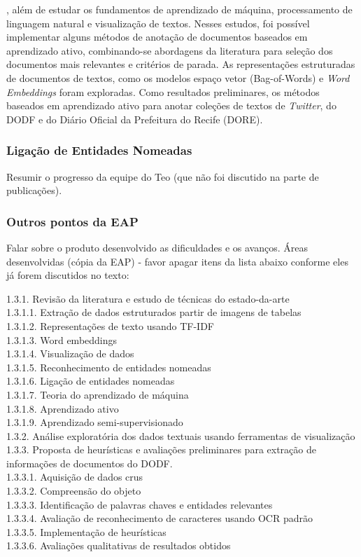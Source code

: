 \documentclass[12pt]{article}
\begin{document}
, além de estudar os fundamentos de aprendizado de máquina, processamento de linguagem natural e visualização de textos. Nesses estudos, foi possível implementar alguns métodos de anotação de documentos baseados em aprendizado ativo, combinando-se abordagens da literatura para seleção dos documentos mais relevantes e critérios de parada. As representações estruturadas de documentos de textos, como os modelos espaço vetor (Bag-of-Words) e \textit{Word Embeddings} foram exploradas. Como resultados preliminares, os métodos baseados em aprendizado ativo para anotar coleções de textos de \textit{Twitter}, do DODF e do Diário Oficial da Prefeitura do Recife (DORE).

\indent 

\subsubsection*{Ligação de Entidades Nomeadas}

	Resumir o progresso da equipe do Teo (que não foi discutido na parte de publicações).

\subsubsection*{Outros pontos da EAP}


Falar sobre o produto desenvolvido as dificuldades e os avanços.
Áreas desenvolvidas (cópia da EAP) - favor apagar itens da lista abaixo conforme eles já forem discutidos no texto:

1.3.1. Revisão da literatura e estudo de técnicas do estado-da-arte\\
1.3.1.1. Extração de dados estruturados partir de imagens de tabelas\\
1.3.1.2. Representações de texto usando TF-IDF\\
1.3.1.3. Word embeddings\\
1.3.1.4. Visualização de dados\\
1.3.1.5. Reconhecimento de entidades nomeadas\\
1.3.1.6. Ligação de entidades nomeadas\\
1.3.1.7. Teoria do aprendizado de máquina\\
1.3.1.8. Aprendizado ativo\\
1.3.1.9. Aprendizado semi-supervisionado\\
1.3.2. Análise exploratória dos dados textuais usando ferramentas de visualização\\
1.3.3. Proposta de heurísticas e avaliações preliminares para extração de informações de
documentos do DODF.\\
1.3.3.1. Aquisição de dados crus\\
1.3.3.2. Compreensão do objeto\\
1.3.3.3. Identificação de palavras chaves e entidades relevantes\\
1.3.3.4. Avaliação de reconhecimento de caracteres usando OCR padrão\\
1.3.3.5. Implementação de heurísticas\\
1.3.3.6. Avaliações qualitativas de resultados obtidos\\
\end{document}
